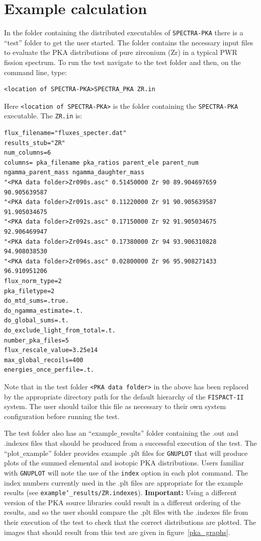 \documentclass[a4paper]{article}
\begin{document}
\section{Example calculation}
In the folder containing the distributed executables of \texttt{SPECTRA-PKA} there is a ``test'' folder to get the user started. The folder contains the necessary input files to evaluate the PKA distributions of pure zirconium (Zr) in a typical PWR fission spectrum. To run the test navigate to the test folder and then, on the command line, type:
\begin{verbatim}
<location of SPECTRA-PKA>SPECTRA_PKA ZR.in
\end{verbatim}
Here \texttt{<location of SPECTRA-PKA>} is the folder containing the \texttt{SPECTRA-PKA} executable. The \texttt{ZR.in} is:
{\footnotesize
\begin{verbatim}
flux_filename="fluxes_specter.dat"
results_stub="ZR"
num_columns=6
columns= pka_filename pka_ratios parent_ele parent_num ngamma_parent_mass ngamma_daughter_mass
"<PKA data folder>Zr090s.asc" 0.51450000 Zr 90 89.904697659 90.905639587
"<PKA data folder>Zr091s.asc" 0.11220000 Zr 91 90.905639587 91.905034675
"<PKA data folder>Zr092s.asc" 0.17150000 Zr 92 91.905034675 92.906469947
"<PKA data folder>Zr094s.asc" 0.17380000 Zr 94 93.906310828 94.908038530
"<PKA data folder>Zr096s.asc" 0.02800000 Zr 96 95.908271433 96.910951206
flux_norm_type=2
pka_filetype=2
do_mtd_sums=.true.
do_ngamma_estimate=.t.
do_global_sums=.t.
do_exclude_light_from_total=.t.
number_pka_files=5
flux_rescale_value=3.25e14
max_global_recoils=400
energies_once_perfile=.t.
\end{verbatim}}
Note that in the test folder \texttt{<PKA data folder>} in the above has been replaced by the appropriate directory path for the default hierarchy of the \texttt{FISPACT-II} system. The user should tailor this file as necessary to their own system configuration before running the test.

The test folder also has an ``example\verb|_|results'' folder containing the .out and .indexes files that should be produced from a successful execution of the test. The ``plot\verb|_|example'' folder provides example .plt files for \texttt{GNUPLOT} that will produce plots of the summed elemental and isotopic PKA distributions. Users familiar with \texttt{GNUPLOT} will note the use of the \texttt{index} option in each plot command. The index numbers currently used in the .plt files are appropriate for the example results (see \texttt{example\char`_results/ZR.indexes}). \textbf{Important:} Using a different version of the PKA source libraries could result in a different ordering of the results, and so the user should compare the .plt files with the .indexes file from their execution of the test to check that the correct distributions are plotted. The images that should result from this test are given in figure~\ref{pka_graphs}.
\end{document}
